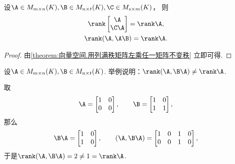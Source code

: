\begin{corollary}\label{theorem:西尔维斯特不等式.分块矩阵的秩的等式3}
设\(\A \in M_{m \times n}(K),
\B \in M_{n \times t}(K),
\C \in M_{s \times m}(K)\)，
则\begin{gather*}
	\rank\begin{bmatrix}
		\A \\
		\C \A
	\end{bmatrix}
	= \rank\A, \\
	\rank(\A,\A \B)
	= \rank\A.
\end{gather*}
\begin{proof}
由\cref{theorem:向量空间.用列满秩矩阵左乘任一矩阵不变秩} 立即可得.
\end{proof}
\end{corollary}
\begin{example}
设\(\A \in M_{m \times n}(K),
\B \in M_{n \times t}(K)\).
举例说明：\(\rank(\A,\B \A) \neq \rank\A\).
\begin{solution}
取\[
	\A = \begin{bmatrix}
		1 & 0 \\
		0 & 0
	\end{bmatrix},
	\qquad
	\B = \begin{bmatrix}
		1 & 0 \\
		1 & 1
	\end{bmatrix},
\]
那么\[
	\B \A = \begin{bmatrix}
		1 & 0 \\
		1 & 0
	\end{bmatrix},
	\qquad
	(\A,\B \A) = \begin{bmatrix}
		1 & 0 & 1 & 0 \\
		0 & 0 & 1 & 0
	\end{bmatrix},
\]
于是\(\rank(\A,\B \A) = 2 \neq 1 = \rank\A\).
\end{solution}
\end{example}

